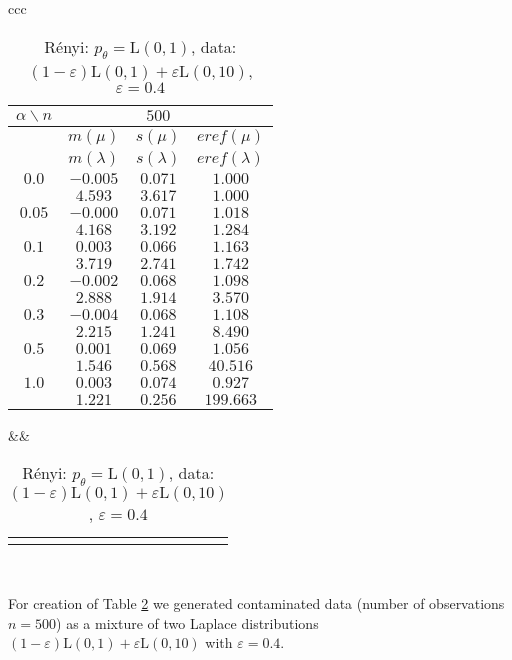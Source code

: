 \begin{table}[htb] \footnotesize
\begin{center}
\begin{tabular}{ccc}
	\begin{tabular}{|c|ccc|} 
	\hline 
	$\alpha\backslash n$ &&  $500$ & \\ 
	\hline 
	& $m(\mu)$ & $s(\mu)$ & $eref(\mu)$ \\ 
	& $m(\lambda)$ & $s(\lambda)$ & $eref(\lambda)$ \\ 
	\hline 
	$0.0$ & $ -0.005 $ & $ 0.071 $ & $ 1.000 $\\ 
	 & $ 4.593 $ & $ 3.617 $ & $ 1.000 $\\ 
	\hline 
	$0.05$ & $ -0.000 $ & $ 0.071 $ & $ 1.018 $\\ 
	 & $ 4.168 $ & $ 3.192 $ & $ 1.284 $\\ 
	\hline 
	$0.1$ & $ 0.003 $ & $ 0.066 $ & $ 1.163 $\\ 
	 & $ 3.719 $ & $ 2.741 $ & $ 1.742 $\\ 
	\hline 
	$0.2$ & $ -0.002 $ & $ 0.068 $ & $ 1.098 $\\ 
	 & $ 2.888 $ & $ 1.914 $ & $ 3.570 $\\ 
	\hline 
	$0.3$ & $ -0.004 $ & $ 0.068 $ & $ 1.108 $\\ 
	 & $ 2.215 $ & $ 1.241 $ & $ 8.490 $\\ 
	\hline 
	$0.5$ & $ 0.001 $ & $ 0.069 $ & $ 1.056 $\\ 
	 & $ 1.546 $ & $ 0.568 $ & $ 40.516 $\\ 
	\hline 
	$1.0$ & $ 0.003 $ & $ 0.074 $ & $ 0.927 $\\ 
	 & $ 1.221 $ & $ 0.256 $ & $ 199.663 $\\ 
	\hline 
	\end{tabular}
&&
	\begin{tabular}{c}
		\epsfig{file=Laplace-e04-eref.eps, height=2in} 
	\end{tabular}
\\
\end{tabular}
\end{center}
\caption{R\'{e}nyi: $p_\theta = \mathrm{L}(0,1)$, data: $(1-\varepsilon)\mathrm{L}(0,1) + \varepsilon \mathrm{L}(0,10)$, $\varepsilon =  0.4$} 
\label{tabJK:laplace-eref}
\end{table}
For creation of Table \ref{tabJK:laplace-eref} we generated contaminated data (number of observations $n = 500$) as a mixture of two Laplace distributions $(1-\varepsilon)\mathrm{L}(0,1) + \varepsilon \mathrm{L}(0,10)$ with $\varepsilon =  0.4$. 
